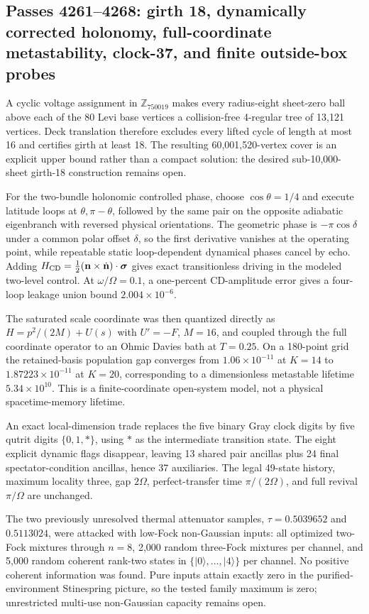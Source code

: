 \subsection*{Passes 4261--4268: girth 18, dynamically corrected holonomy, full-coordinate metastability, clock-37, and finite outside-box probes}
A cyclic voltage assignment in $\mathbb Z_{750019}$ makes every radius-eight sheet-zero ball above each of the 80 Levi base vertices a collision-free 4-regular tree of 13,121 vertices. Deck translation therefore excludes every lifted cycle of length at most 16 and certifies girth at least 18. The resulting 60,001,520-vertex cover is an explicit upper bound rather than a compact solution: the desired sub-10,000-sheet girth-18 construction remains open.

For the two-bundle holonomic controlled phase, choose $\cos\theta=1/4$ and execute latitude loops at $\theta,\pi-\theta$, followed by the same pair on the opposite adiabatic eigenbranch with reversed physical orientations. The geometric phase is $-\pi\cos\delta$ under a common polar offset $\delta$, so the first derivative vanishes at the operating point, while repeatable static loop-dependent dynamical phases cancel by echo. Adding $H_{\rm CD}=\tfrac12(\mathbf n\times\dot{\mathbf n})\cdot\boldsymbol\sigma$ gives exact transitionless driving in the modeled two-level control. At $\omega/\Omega=0.1$, a one-percent CD-amplitude error gives a four-loop leakage union bound $2.004\times10^{-6}$.

The saturated scale coordinate was then quantized directly as $H=p^2/(2M)+U(s)$ with $U'=-F$, $M=16$, and coupled through the full coordinate operator to an Ohmic Davies bath at $T=0.25$. On a 180-point grid the retained-basis population gap converges from $1.06\times10^{-11}$ at $K=14$ to $1.87223\times10^{-11}$ at $K=20$, corresponding to a dimensionless metastable lifetime $5.34\times10^{10}$. This is a finite-coordinate open-system model, not a physical spacetime-memory lifetime.

An exact local-dimension trade replaces the five binary Gray clock digits by five qutrit digits $\{0,1,*\}$, using $*$ as the intermediate transition state. The eight explicit dynamic flags disappear, leaving 13 shared pair ancillas plus 24 final spectator-condition ancillas, hence 37 auxiliaries. The legal 49-state history, maximum locality three, gap $2\Omega$, perfect-transfer time $\pi/(2\Omega)$, and full revival $\pi/\Omega$ are unchanged.

The two previously unresolved thermal attenuator samples, $\tau=0.5039652$ and $0.5113024$, were attacked with low-Fock non-Gaussian inputs: all optimized two-Fock mixtures through $n=8$, 2,000 random three-Fock mixtures per channel, and 5,000 random coherent rank-two states in $\{|0\rangle,\ldots,|4\rangle\}$ per channel. No positive coherent information was found. Pure inputs attain exactly zero in the purified-environment Stinespring picture, so the tested family maximum is zero; unrestricted multi-use non-Gaussian capacity remains open.

